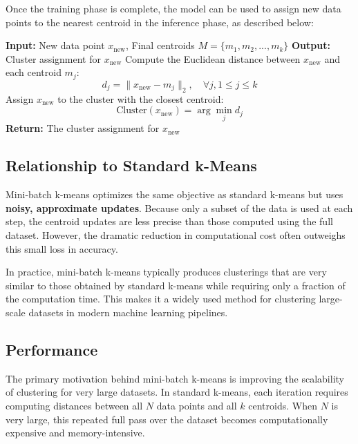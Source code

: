 \documentclass{article}
\begin{document}
\noindent Once the training phase is complete, the model can be used to assign
new data points to the nearest centroid in the inference phase, as described
below:

\begin{algorithm}[H]
\caption{Mini-batch k-Means Clustering Algorithm (Inference Phase)}
\begin{algorithmic}[1]
\State \textbf{Input:} New data point $x_{\text{new}}$, Final centroids $M = \{m_1, m_2, ..., m_k\}$
\State \textbf{Output:} Cluster assignment for $x_{\text{new}}$
\State Compute the Euclidean distance between $x_{\text{new}}$ and each centroid $m_j$:
\[
d_j = \|x_{\text{new}} - m_j\|_2, \quad \forall j, 1 \leq j \leq k
\]
\State Assign $x_{\text{new}}$ to the cluster with the closest centroid:
\[
\text{Cluster}(x_{\text{new}}) = \arg \min_{j} d_j
\]
\State \textbf{Return:} The cluster assignment for $x_{\text{new}}$
\end{algorithmic}
\end{algorithm}

\subsection{Relationship to Standard k-Means}

Mini-batch k-means optimizes the same objective as standard k-means but uses
\textbf{noisy, approximate updates}. Because only a subset of the data is used
at each step, the centroid updates are less precise than those computed using
the full dataset. However, the dramatic reduction in computational cost often
outweighs this small loss in accuracy.

In practice, mini-batch k-means typically produces clusterings that are very
similar to those obtained by standard k-means while requiring only a fraction
of the computation time. This makes it a widely used method for clustering
large-scale datasets in modern machine learning pipelines.


\subsection{Performance}

The primary motivation behind mini-batch k-means is improving the scalability of
clustering for very large datasets. In standard k-means, each iteration requires
computing distances between all $N$ data points and all $k$ centroids. When $N$
is very large, this repeated full pass over the dataset becomes computationally
expensive and memory-intensive.
\end{document}
